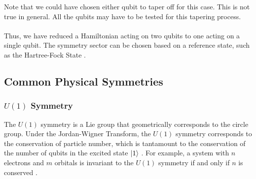 \documentclass{article}
\begin{document}
{\footnotesize Note that we could have chosen either qubit to taper off for this case. This is not true in general. All the qubits may have to be tested for this tapering process.}\\\\
Thus, we have reduced a Hamiltonian acting on two qubits to one acting on a single qubit. The symmetry sector can be chosen based on a reference state, such as the Hartree-Fock State \cite{setiaReducingQubitRequirements2020}.


\subsection{Common Physical Symmetries}

\subsubsection{$U(1)$ Symmetry}

The $U(1)$ symmetry is a Lie group that geometrically corresponds to the circle group. Under the Jordan-Wigner Transform, the $U(1)$ symmetry corresponds to the conservation of particle number, which is tantamount to the conservation of the number of qubits in the excited state $\ket{1}$ \cite{gardEfficientSymmetrypreservingState2020}. For example, a system with $n$ electrons and $m$ orbitals is invariant to the $U(1)$ symmetry if and only if $n$ is conserved \cite{Mbeng2024Quantum_Ising}.
\end{document}
